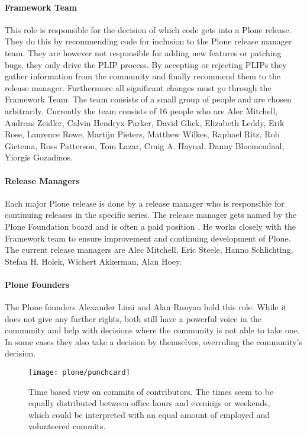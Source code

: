 \paragraph{Framework Team}

This role is responsible for the decision of which code gets into a Plone
release. They do this by recommending code for inclusion to the Plone release
manager team. They are however not responsible for adding new features or
patching bugs, they only drive the \ac{PLIP} process. By accepting or rejecting
\acp{PLIP} they gather information from the community and finally recommend
them to the release manager. Furthermore all significant changes must go
through the Framework Team. The team consists of a small group of people and
are chosen arbitrarily. Currently the team consists of 16 people who are Alec
Mitchell, Andreas Zeidler, Calvin Hendryx-Parker, David Glick, Elizabeth Leddy,
Erik Rose, Laurence Rowe, Martijn Pieters, Matthew Wilkes, Raphael Ritz, Rob
Gietema, Ross Patterson, Tom Lazar, Craig A. Haynal, Danny Bloemendaal, Yiorgis
Gozadinos.

\paragraph{Release Managers}

Each major Plone release is done by a release manager who is responsible for
continuing releases in the specific series. The release manager gets named by
the Plone Foundation board and is often a paid position
\cite{PlonePaidReleaseManager}. He works closely with the Framework team to
ensure improvement and continuing development of Plone. The current release
managers are Alec Mitchell, Eric Steele, Hanno Schlichting, Stefan H. Holek,
Wichert Akkerman, Alan Hoey.

\paragraph{Plone Founders}

The Plone founders Alexander Limi and Alan Runyan hold this role. While it does
not give any further rights, both still have a powerful voice in the community
and help with decisions where the community is not able to take one. In some
cases they also take a decision by themselves, overruling the community's
decision.

\begin{figure}[hbtp]
  \centering
  \texttt{[image: plone/punchcard]}
  \caption{Time based view on commits of contributors. The times seem to be
  equally distributed between office hours and evenings or weekends, which
  could be interpreted with an equal amount of employed and volunteered commits.}
\end{figure}

